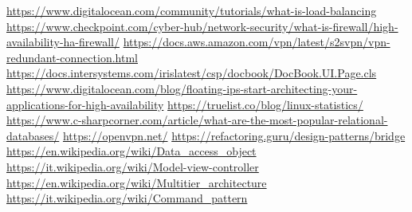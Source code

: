 \begin{thebibliography}{9}
     \url{https://www.digitalocean.com/community/tutorials/what-is-load-balancing}
     \url{https://www.checkpoint.com/cyber-hub/network-security/what-is-firewall/high-availability-ha-firewall/}
     \url{https://docs.aws.amazon.com/vpn/latest/s2svpn/vpn-redundant-connection.html}
     \url{https://docs.intersystems.com/irislatest/csp/docbook/DocBook.UI.Page.cls}
     \url{https://www.digitalocean.com/blog/floating-ips-start-architecting-your-applications-for-high-availability}
     \url{https://truelist.co/blog/linux-statistics/}
     \url{https://www.c-sharpcorner.com/article/what-are-the-most-popular-relational-databases/}
     \url{https://openvpn.net/}
     \url{https://refactoring.guru/design-patterns/bridge}
     \url{https://en.wikipedia.org/wiki/Data_access_object}
     \url{https://it.wikipedia.org/wiki/Model-view-controller}
     \url{https://en.wikipedia.org/wiki/Multitier_architecture}
     \url{https://it.wikipedia.org/wiki/Command_pattern}
\end{thebibliography}